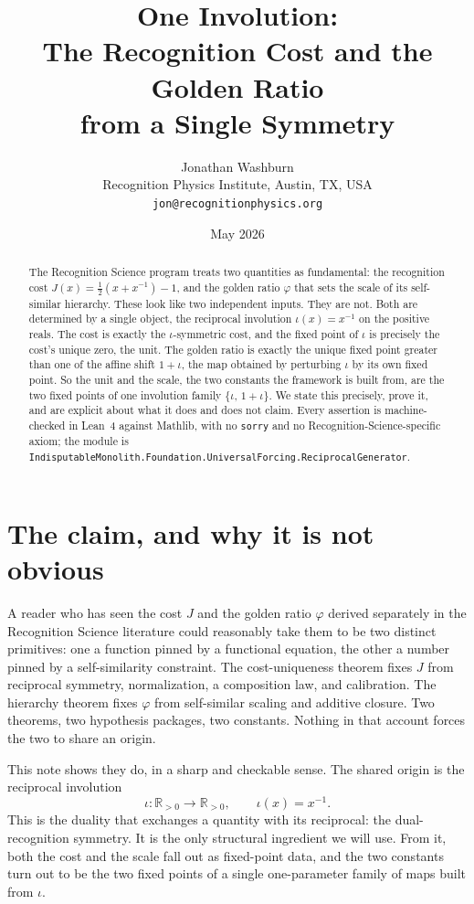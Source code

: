\documentclass[11pt,a4paper]{article}
\title{%
  One Involution:\\
  The Recognition Cost and the Golden Ratio\\
  from a Single Symmetry}
\author{%
  Jonathan Washburn\\
  Recognition Physics Institute, Austin, TX, USA\\
  \texttt{jon@recognitionphysics.org}}
\date{May 2026}
\theoremstyle{definition}
\theoremstyle{remark}
\begin{document}
\maketitle

\begin{abstract}\sloppy
The Recognition Science program treats two quantities as fundamental: the
recognition cost $J(x)=\tfrac12(x+x^{-1})-1$, and the golden ratio $\varphi$ that
sets the scale of its self-similar hierarchy. These look like two independent
inputs. They are not. Both are determined by a single object, the reciprocal
involution $\iota(x)=x^{-1}$ on the positive reals. The cost is exactly the
$\iota$-symmetric cost, and the fixed point of $\iota$ is precisely the cost's
unique zero, the unit. The golden ratio is exactly the unique fixed point greater
than one of the affine shift $1+\iota$, the map obtained by perturbing $\iota$ by
its own fixed point. So the unit and the scale, the two constants the framework
is built from, are the two fixed points of one involution family $\{\iota,\,
1+\iota\}$. We state this precisely, prove it, and are explicit about what it does
and does not claim. Every assertion is machine-checked in Lean~4 against Mathlib,
with no \texttt{sorry} and no Recognition-Science-specific axiom; the module is
\texttt{IndisputableMonolith.Foundation.UniversalForcing.ReciprocalGenerator}.
\end{abstract}

\section{The claim, and why it is not obvious}

A reader who has seen the cost $J$ and the golden ratio $\varphi$ derived
separately in the Recognition Science literature could reasonably take them to be
two distinct primitives: one a function pinned by a functional equation, the other
a number pinned by a self-similarity constraint. The cost-uniqueness theorem fixes
$J$ from reciprocal symmetry, normalization, a composition law, and calibration.
The hierarchy theorem fixes $\varphi$ from self-similar scaling and additive
closure. Two theorems, two hypothesis packages, two constants. Nothing in that
account forces the two to share an origin.

This note shows they do, in a sharp and checkable sense. The shared origin is the
reciprocal involution
\[
  \iota \colon \mathbb{R}_{>0}\to\mathbb{R}_{>0},\qquad \iota(x)=x^{-1}.
\]
This is the duality that exchanges a quantity with its reciprocal: the
dual-recognition symmetry. It is the only structural ingredient we will use. From
it, both the cost and the scale fall out as fixed-point data, and the two
constants turn out to be the two fixed points of a single one-parameter family of
maps built from $\iota$.
\end{document}
